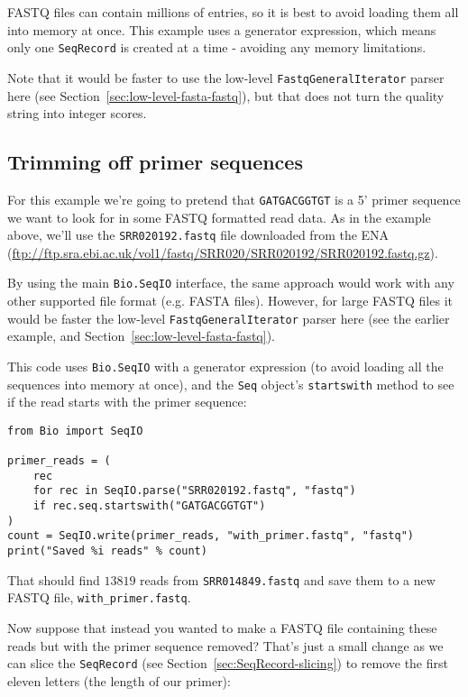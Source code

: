 FASTQ files can contain millions of entries, so it is best to avoid loading
them all into memory at once.  This example uses a generator expression, which
means only one \verb|SeqRecord| is created at a time - avoiding any memory
limitations.

Note that it would be faster to use the low-level \verb|FastqGeneralIterator|
parser here (see Section~\ref{sec:low-level-fasta-fastq}), but that does not
turn the quality string into integer scores.

\subsection{Trimming off primer sequences}
\label{sec:FASTQ-slicing-off-primer}

For this example we're going to pretend that \texttt{GATGACGGTGT} is a 5' primer
sequence we want to look for in some FASTQ formatted read data.  As in the example
above, we'll use the \texttt{SRR020192.fastq} file downloaded from the ENA
(\url{ftp://ftp.sra.ebi.ac.uk/vol1/fastq/SRR020/SRR020192/SRR020192.fastq.gz}).

By using the main \verb|Bio.SeqIO| interface, the same approach would work with
any other supported file format (e.g. FASTA files). However, for large FASTQ
files it would be faster the low-level \verb|FastqGeneralIterator| parser here
(see the earlier example, and Section~\ref{sec:low-level-fasta-fastq}).

This code uses \verb|Bio.SeqIO| with a generator expression (to avoid loading
all the sequences into memory at once), and the \verb|Seq| object's
\verb|startswith| method to see if the read starts with the primer sequence:

\begin{verbatim}
from Bio import SeqIO

primer_reads = (
    rec
    for rec in SeqIO.parse("SRR020192.fastq", "fastq")
    if rec.seq.startswith("GATGACGGTGT")
)
count = SeqIO.write(primer_reads, "with_primer.fastq", "fastq")
print("Saved %i reads" % count)
\end{verbatim}

\noindent That should find $13819$ reads from \texttt{SRR014849.fastq} and save them to
a new FASTQ file, \texttt{with\_primer.fastq}.

Now suppose that instead you wanted to make a FASTQ file containing these reads
but with the primer sequence removed?  That's just a small change as we can slice the
\verb|SeqRecord| (see Section~\ref{sec:SeqRecord-slicing}) to remove the first eleven
letters (the length of our primer):

